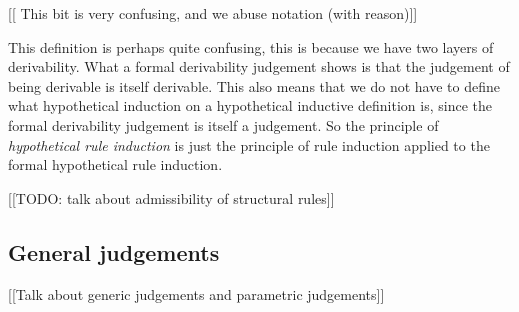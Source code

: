 [[ This bit is very confusing, and we abuse notation (with reason)]]
\begin{remark}
    This definition is perhaps quite confusing, this is because we have two layers of derivability. What a formal derivability judgement shows is that the judgement of being derivable is itself derivable. This also means that we do not have to define what hypothetical induction on a hypothetical inductive definition is, since the formal derivability judgement is itself a judgement. So the principle of \emph{hypothetical rule induction} is just the principle of rule induction applied to the formal hypothetical rule induction.
\end{remark}

[[TODO: talk about admissibility of structural rules]]

\subsection{General judgements}

[[Talk about generic judgements and parametric judgements]]










